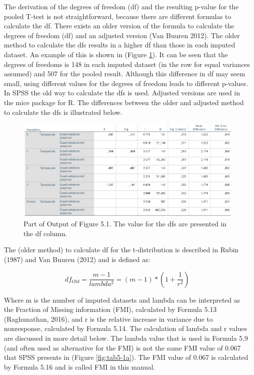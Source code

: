 \documentclass[]{book}
\theoremstyle{definition}
\theoremstyle{definition}
\theoremstyle{definition}
\theoremstyle{remark}
\begin{document}
The derivation of the degrees of freedom (df) and the resulting p-value
for the pooled T-test is not straightforward, because there are
different formulas to calculate the df. There exists an older version of
the formula to calculate the degrees of freedom (df) and an adjusted
version (Van Buuren 2012). The older method to calculate the dfs results
in a higher df than those in each imputed dataset. An example of this is
shown in (Figure \ref{fig:tab5-2}). It can be seen that the degrees of
freedoms is 148 in each imputed dataset (in the row for equal variances
assumed) and 507 for the pooled result. Although this difference in df
may seem small, using different values for the degrees of freedom leads
to different p-values. In SPSS the old way to calculate the dfs is used.
Adjusted versions are used in the mice package for R. The differences
between the older and adjusted method to calculate the dfs is
illustrated below.

\begin{figure}

{\centering \includegraphics[width=0.9\linewidth]{images/table5.2} 

}

\caption{Part of Output of Figure 5.1. The value for the dfs are presented in the df column.}\label{fig:tab5-2}
\end{figure}

The (older method) to calculate df for the t-distribution is described
in Rubin (1987) and Van Buuren (2012) and is defined as:

\begin{equation}
df_{Old} = \frac{m-1}{lambda^2} = (m-1) * (1 + \frac{1}{r^2})
  \label{eq:df-old}
\end{equation}

Where m is the number of imputed datasets and lambda can be interpreted
as the Fraction of Missing information (FMI), calculated by Formula 5.13
(Raghunathan, 2016), and r is the relative increase in variance due to
nonresponse, calculated by Formula 5.14. The calculation of lambda and r
values are discussed in more detail below. The lambda value that is used
in Formula 5.9 (and often used as alternative for the FMI) is not the
same FMI value of 0.067 that SPSS presents in (Figure
\ref{fig:tab5-1a}). The FMI value of 0.067 is calculated by Formula 5.16
and is called FMI in this manual.
\end{document}
